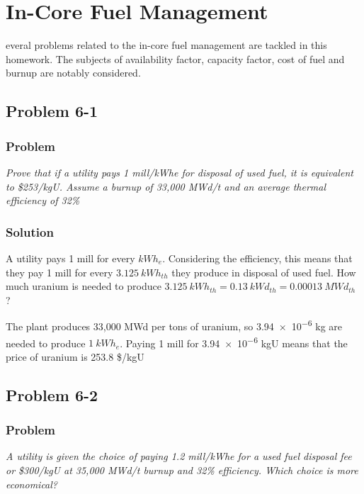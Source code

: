%
%
\let\textcircled=\pgftextcircled
\chapter{In-Core Fuel Management}
\label{chap:intro}

everal problems related to the in-core fuel management are tackled in this homework. The subjects of availability factor, capacity factor, cost of fuel and burnup are notably considered.

\section{Problem 6-1}
\label{prob61}


\subsection{Problem}
\textit{Prove that if a utility pays 1 mill/kWhe for disposal of used fuel, it is equivalent to \$253/kgU. Assume a burnup of 33,000 MWd/t and an average thermal efficiency of 32\%}

\subsection{Solution}

A utility pays 1 mill for every $kWh_e$. Considering the efficiency, this means that they pay 1 mill for every $3.125\ kWh_{th}$ they produce in disposal of used fuel. How much uranium is needed to produce $3.125\ kWh_{th} = 0.13\ kWd_{th} = 0.00013\ MWd_{th}$ ?

The plant produces 33,000 MWd per tons of uranium, so \num{3.94e-6} kg are needed to produce $1\ kWh_e$. Paying 1 mill for \num{3.94e-6} kgU means that the price of uranium is 253.8 \$/kgU


\section{Problem 6-2}
\label{prob62}


\subsection{Problem}
\textit{A utility is given the choice of paying 1.2 mill/kWhe for a used fuel disposal fee or \$300/kgU at 35,000 MWd/t burnup and 32\% efficiency. Which choice is more economical?}

